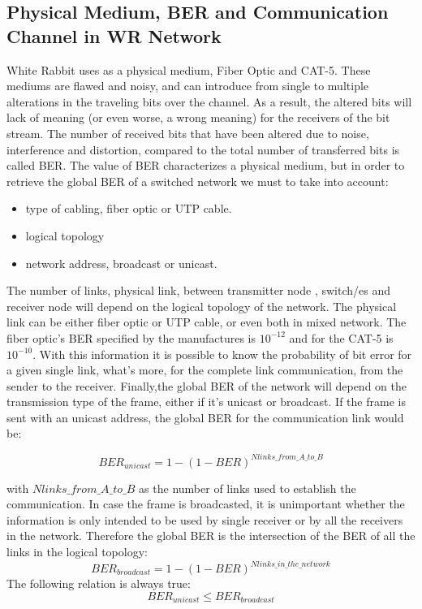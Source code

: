 \subsection{Physical Medium, BER and Communication Channel in WR Network} 

White Rabbit uses as a physical medium, Fiber Optic and CAT-5. These
mediums are flawed and noisy, and can introduce from single to multiple
alterations in the traveling bits over the channel. As a result, the altered 
bits will lack of meaning (or even worse, a wrong meaning) for the receivers
of the bit stream. The number of received bits that have been altered due to
noise, interference and distortion, compared to the total number of transferred
bits is called BER. 
The value of BER characterizes a physical medium, but in order
to retrieve the global BER of a switched network we must to take into account:
\begin{itemize}
	\item type of cabling, fiber optic or UTP cable. 
	\item logical topology  
	\item network address, broadcast or unicast. 
\end{itemize}

The number of links, physical link, between transmitter node , switch/es and
receiver node will depend on the logical topology of the network. The
physical link can be either fiber optic or UTP cable, or even both in mixed
network. The fiber optic's BER specified by the manufactures is $10^{-12}$ and
for the CAT-5 is $10^{-10}$. With this information it is possible to know the
probability of bit error for a given single link, what's more, for the complete
link communication, from the sender to the receiver. Finally,the global BER of
the network will depend on the transmission type of the frame, either if it's 
unicast or broadcast. If the frame is sent with an unicast address, the global
BER for the communication link would be:

\begin{equation}
BER_{unicast} = 1 - (1 - BER)^{N{links\_from\_A\_to\_B}} 
\end{equation}

with $N{links\_from\_A\_to\_B}$ as the number of links used to establish the
communication. In case the frame is broadcasted, it is unimportant whether the
information is only intended to be used by single receiver or by all the
receivers in the network. Therefore the global BER is the intersection of the
BER of all the links in the logical topology:
\begin{equation}
BER_{broadcast} = 1 - (1 - BER)^{N{links\_in\_the\_network}} 
\end{equation}
The following relation is always true:
\begin{equation}
   BER_{unicast} \leq BER_{broadcast} 
\end{equation}

